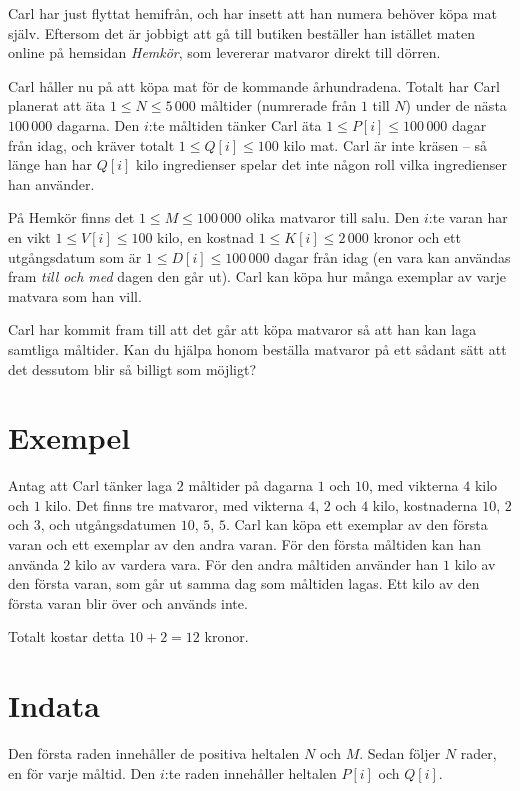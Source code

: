 \def\version{1}
Carl har just flyttat hemifrån, och har insett att han numera behöver köpa mat själv.
Eftersom det är jobbigt att gå till butiken beställer han istället maten online på hemsidan \emph{Hemkör}, som levererar matvaror direkt till dörren.

Carl håller nu på att köpa mat för de kommande århundradena.
Totalt har Carl planerat att äta $1 \le N \le 5\,000$ måltider (numrerade från $1$ till $N$) under de nästa $100\,000$ dagarna.
Den $i$:te måltiden tänker Carl äta $1 \le P[i] \le 100\,000$ dagar från idag, och kräver totalt $1 \le Q[i] \le 100$ kilo mat.
Carl är inte kräsen -- så länge han har $Q[i]$ kilo ingredienser spelar det inte någon roll vilka ingredienser han använder.

På Hemkör finns det $1 \le M \le 100\,000$ olika matvaror till salu.
Den $i$:te varan har en vikt $1 \le V[i] \le 100$ kilo, en kostnad $1 \le K[i] \le 2\,000$ kronor och ett utgångsdatum som är $1 \le D[i] \le 100\,000$ dagar från idag (en vara kan användas fram \emph{till och med} dagen den går ut).
Carl kan köpa hur många exemplar av varje matvara som han vill.

Carl har kommit fram till att det går att köpa matvaror så att han kan laga samtliga måltider.
Kan du hjälpa honom beställa matvaror på ett sådant sätt att det dessutom blir så billigt som möjligt?


\section*{Exempel}
Antag att Carl tänker laga $2$ måltider på dagarna $1$ och $10$, med vikterna $4$ kilo och $1$ kilo.
Det finns tre matvaror, med vikterna $4$, $2$ och $4$ kilo, kostnaderna $10$, $2$ och $3$, och utgångsdatumen $10$, $5$, $5$.
Carl kan köpa ett exemplar av den första varan och ett exemplar av den andra varan.
För den första måltiden kan han använda $2$ kilo av vardera vara.
För den andra måltiden använder han $1$ kilo av den första varan, som går ut samma dag som måltiden lagas.
Ett kilo av den första varan blir över och används inte.

Totalt kostar detta $10 + 2 = 12$ kronor.

\section*{Indata}
Den första raden innehåller de positiva heltalen $N$ och $M$.
Sedan följer $N$ rader, en för varje måltid.
Den $i$:te raden innehåller heltalen $P[i]$ och $Q[i]$.


